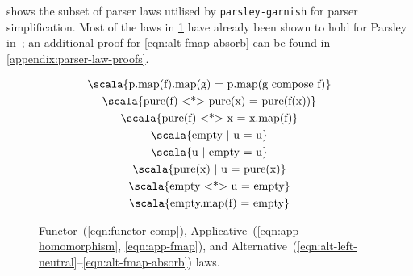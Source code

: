 \documentclass[../../main.tex]{subfiles}
\begin{document}
 shows the subset of parser laws utilised by \texttt{parsley-garnish} for parser simplification.
Most of the laws in \cref{fig:parser-laws} have already been shown to hold for Parsley in~\cite{willis_garnishing_2018}; an additional proof for \cref{eqn:alt-fmap-absorb} can be found in \cref{appendix:parser-law-proofs}.

\begin{figure}[htbp]
\centering
\begin{gather}
  \text{\scala{p.map(f).map(g) = p.map(g compose f)}} \label{eqn:functor-comp} \\
  \text{\scala{pure(f) <*> pure(x) = pure(f(x))}} \label{eqn:app-homomorphism} \\
  \text{\scala{pure(f) <*> x = x.map(f)}} \label{eqn:app-fmap} \\
  \text{\scala{empty | u = u}} \label{eqn:alt-left-neutral} \\
  \text{\scala{u | empty = u}} \label{eqn:alt-right-neutral} \\
  \text{\scala{pure(x) | u = pure(x)}} \label{eqn:alt-left-biased-choice} \\
  \text{\scala{empty <*> u = empty}} \label{eqn:alt-empty-absorb} \\
  \text{\scala{empty.map(f) = empty}} \label{eqn:alt-fmap-absorb}
\end{gather}
\caption{Functor~(\ref{eqn:functor-comp}), Applicative~(\ref{eqn:app-homomorphism}, \ref{eqn:app-fmap}), and Alternative~(\ref{eqn:alt-left-neutral}--\ref{eqn:alt-fmap-absorb}) laws.}
\label{fig:parser-laws}
\end{figure}
\end{document}
